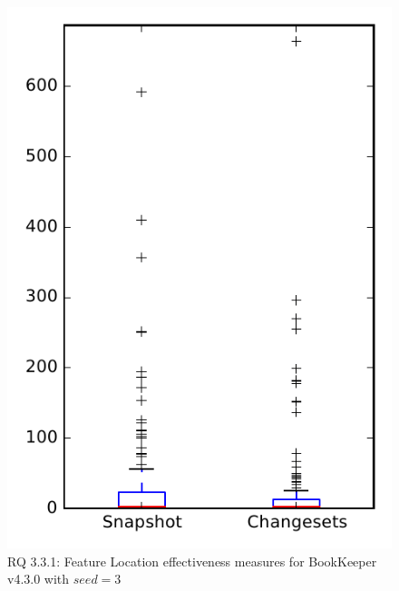
\begin{figure}
\centering
\includegraphics[height=0.4\textheight]{figures/flt_seed/rq1_bookkeeper_3}
\caption{RQ 3.3.1: Feature Location effectiveness measures for BookKeeper v4.3.0 with $seed=3$}
\label{fig:flt_seed:rq1:bookkeeper}
\end{figure}
